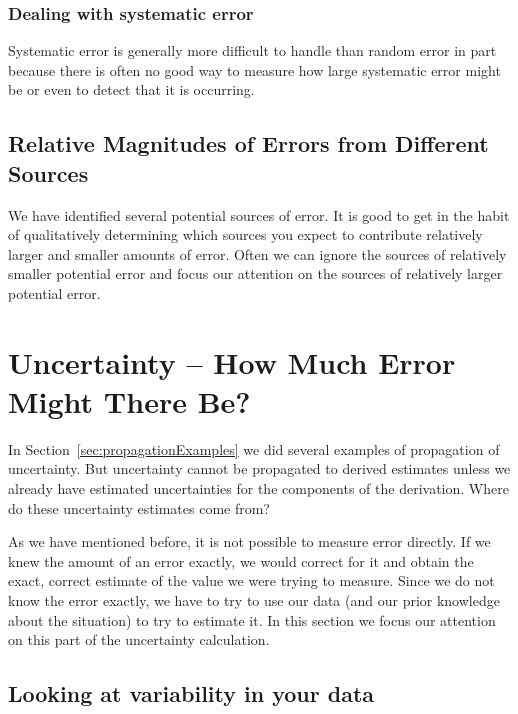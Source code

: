 \documentclass[twoside]{book}\usepackage[]{graphicx}\usepackage[]{xcolor}
\newcounter{example}[section]
\begin{document}
\subsubsection{Dealing with systematic error}
Systematic error is generally more difficult to handle than random error in
part because there is often no good way to measure how large systematic error
might be or even to detect that it is occurring.

\subsection{Relative Magnitudes of Errors from Different Sources}

We have identified several potential sources of error.  
It is good to get in the habit of qualitatively determining which sources you expect to contribute
relatively larger and smaller amounts of error.  Often we can ignore the sources of relatively
smaller potential error and focus our attention on the sources of relatively larger potential
error.


\section{Uncertainty -- How Much Error Might There Be?}

In Section~\ref{sec:propagationExamples} we did several examples of propagation of 
uncertainty.  But uncertainty cannot be propagated to derived estimates unless we already
have estimated uncertainties for the components of the derivation.
Where do these uncertainty estimates come from?

As we have mentioned before, it is not possible to measure error directly.  
If we knew the amount of an error exactly, we would correct for it and obtain the exact, correct 
estimate of the value we were trying to measure.  
Since we do not know the error exactly, we have to try to use our data 
(and our prior knowledge about the situation) to try to estimate it. In this section we focus 
our attention on this part of the uncertainty calculation.

\subsection{Looking at variability in your data}
\end{document}
